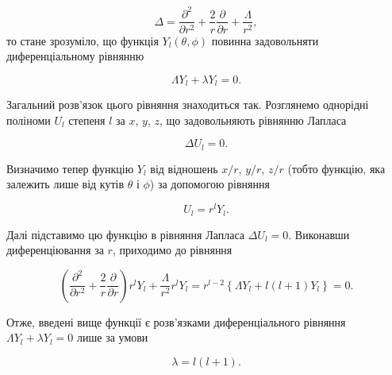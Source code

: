 \documentclass{article}
\begin{document}
\begin{equation}
\Delta = \frac{\partial^2}{\partial r^2} + \frac{2}{r} \frac{\partial}{\partial r} + \frac{\Lambda}{r^2},
\end{equation}
%
то стане зрозуміло, що функція $Y_l(\theta, \phi)$ повинна задовольняти диференціальному рівнянню

\begin{equation}
\Lambda Y_l + \lambda Y_l = 0.
\end{equation}

Загальний розв'язок цього рівняння знаходиться так. Розглянемо однорідні поліноми $U_l$ степеня $l$ за $x$, $y$, $z$, що задовольняють рівнянню Лапласа

\begin{equation}
\Delta U_l = 0.
\end{equation}

Визначимо тепер функцію $Y_l$ від відношень $x/r$, $y/r$, $z/r$ (тобто функцію, яка залежить лише від кутів $\theta$ і $\phi$) за допомогою рівняння

\begin{equation}
U_l = r^l Y_l.
\end{equation}

Далі підставимо цю функцію в рівняння Лапласа $\Delta U_l = 0$. Виконавши диференціювання за $r$, приходимо до рівняння

\begin{equation}
\left( \frac{\partial^2}{\partial r^2} + \frac{2}{r} \frac{\partial}{\partial r} \right) r^l Y_l + \frac{\Lambda}{r^2} r^l Y_l = r^{l-2} \left\{ \Lambda Y_l + l(l+1) Y_l \right\} = 0.
\end{equation}

Отже, введені вище функції є розв'язками диференціального рівняння $\Lambda Y_l + \lambda Y_l = 0$ лише за умови

\begin{equation}
\lambda = l(l+1).
\end{equation}
\end{document}
